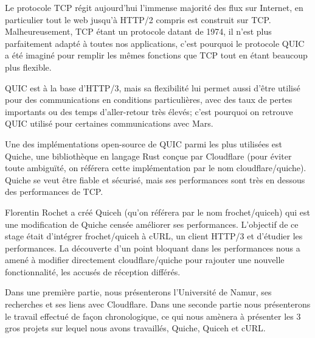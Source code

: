 Le protocole TCP régit aujourd'hui l'immense majorité des flux sur Internet, en particulier tout le web jusqu'à HTTP/2 compris est construit sur TCP.
Malheureusement, TCP étant un protocole datant de 1974, il n'est plus parfaitement adapté à toutes nos applications, c'est pourquoi le protocole QUIC a été imaginé pour remplir les mêmes fonctions que TCP tout en étant beaucoup plus flexible.

QUIC est à la base d'HTTP/3, mais sa flexibilité lui permet aussi d'être utilisé pour des communications en conditions particulières, avec des taux de pertes importants ou des temps d'aller-retour très élevés; c'est pourquoi on retrouve QUIC utilisé pour certaines communications avec Mars.

Une des implémentations open-source de QUIC parmi les plus utilisées est Quiche, une bibliothèque en langage Rust conçue par Cloudflare (pour éviter toute ambiguïté, on référera cette implémentation par le nom cloudflare/quiche). Quiche se veut être fiable et sécurisé, mais ses performances sont très en dessous des performances de TCP.

Florentin Rochet a créé Quiceh (qu'on référera par le nom frochet/quiceh) qui est une modification de Quiche censée améliorer ses performances. L'objectif de ce stage était d'intégrer frochet/quiceh à cURL, un client HTTP/3 et d'étudier les performances. La découverte d'un point bloquant dans les performances nous a amené à modifier directement cloudflare/quiche pour rajouter une nouvelle fonctionnalité, les accusés de réception différés.

\vspace{0.5cm}

Dans une première partie, nous présenterons l'Université de Namur, ses recherches et ses liens avec Cloudflare. Dans une seconde partie nous présenterons le travail effectué de façon chronologique, ce qui nous amènera à présenter les 3 gros projets sur lequel nous avons travaillés, Quiche, Quiceh et cURL.